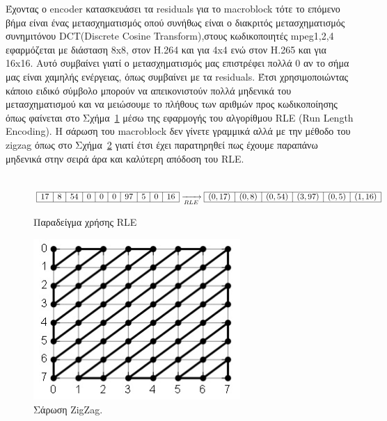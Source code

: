 \indent Έχοντας ο encoder κατασκευάσει τα residuals για το macroblock τότε το επόμενο βήμα είναι ένας μετασχηματισμός οπού συνήθως είναι ο διακριτός μετασχηματισμός συνημιτόνου DCT(Discrete Cosine Transform),στους κωδικοποιητές mpeg1,2,4 εφαρμόζεται με διάσταση 8x8, στον H.264 και για 4x4 ενώ στον Η.265 και για 16x16. Αυτό συμβαίνει γιατί ο μετασχηματισμός μας επιστρέφει πολλά 0 αν το σήμα μας είναι χαμηλής ενέργειας, όπως συμβαίνει με τα residuals. Έτσι χρησιμοποιώντας κάποιο ειδικό σύμβολο μπορούν να απεικονιστούν πολλά μηδενικά του μετασχηματισμού και να μειώσουμε το πλήθους των αριθμών προς κωδικοποίησης όπως φαίνεται στο Σχήμα~\ref{eq:rle} μέσω της εφαρμογής του αλγορίθμου RLE (Run Length Encoding). Η σάρωση του macroblock δεν γίνετε γραμμικά αλλά με την μέθοδο του zigzag όπως στο Σχήμα~\ref{fig:zigzag} γιατί έτσι έχει παρατηρηθεί πως έχουμε παραπάνω μηδενικά στην σειρά άρα και καλύτερη απόδοση του RLE.
\\
\\
\begin{figure}[H]
\centering
$
\begin{array}{| c | c | c | c | c | c | c | c | c | c |}
    \hline 17 & 8 & 54 & 0 & 0 & 0 & 97 & 5 & 0 & 16 \\ \hline
\end{array}
\xrightarrow[RLE]{}
\begin{array}{| c | c | c | c | c | c |}
    \hline (0,17) & (0,8) & (0,54) & (3,97) & (0,5) & (1,16) \\ \hline
\end{array}
$
\caption{Παραδείγμα χρήσης RLE}
\label{eq:rle}
\end{figure}

\begin{figure}[H]
  \centering
  \includegraphics[width=0.7\textwidth]{chapter2/zigzag.jpg}
  \caption{Σάρωση ZigZag. \cite{misc:zigzag}}
  \label{fig:zigzag}
\end{figure}

